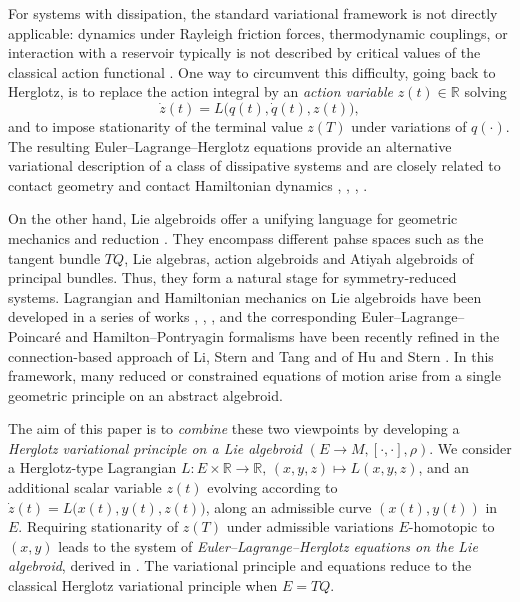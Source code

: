 \documentclass[11pt,a4paper]{article}
\theoremstyle{definition}
\begin{document}
For systems with dissipation, the standard variational framework is
not directly applicable: dynamics under Rayleigh friction forces, thermodynamic
couplings, or interaction with a reservoir typically is not described by critical values of the classical action functional \cite{GayBalmazYoshimura2017PartI}.
One way to circumvent this difficulty, going back to Herglotz,
is to replace the action integral by an \emph{action variable}
$z(t)\in\mathbb{R}$ solving
\[
\dot z(t) = L\big(q(t),\dot q(t),z(t)\big),
\]
and to impose stationarity of the terminal value $z(T)$ under
variations of $q(\cdot)$.
The resulting Euler--Lagrange--Herglotz equations provide an alternative
variational description of a class of dissipative systems and
are closely related to contact geometry and contact Hamiltonian dynamics \cite{de2019contact}, \cite{de2020infinitesimal}, \cite{colombo2025liouville}, \cite{colombo2025homogeneous}.

On the other hand, Lie algebroids offer a unifying language for
geometric mechanics and reduction \cite{weinstein1996lagrangian}.
They encompass different pahse spaces such as the tangent bundle $TQ$, Lie algebras, action
algebroids and Atiyah algebroids of principal bundles. Thus, they form
a natural stage for symmetry-reduced
systems.
Lagrangian and Hamiltonian mechanics on Lie algebroids have been
developed in a series of works \cite{martinez2001lagrangian}, \cite{de2005lagrangian}, \cite{grabowska2006geometrical}, and the corresponding
Euler--Lagrange--Poincar\'e and Hamilton--Pontryagin formalisms have
been recently refined in the connection-based approach of
Li, Stern and Tang \cite{li2017lagrangian} and of Hu and Stern \cite{hu2024hamiltonian}.
In this framework, many reduced or constrained equations of motion
arise from a single geometric principle on an abstract algebroid.

The aim of this paper is to \emph{combine} these two viewpoints by
developing a \emph{Herglotz variational principle on a Lie algebroid}
$(E\to M,[\cdot,\cdot],\rho)$.
We consider a Herglotz-type Lagrangian $L \colon E \times \mathbb{R} \to \mathbb{R},\, (x,y,z)\mapsto L(x,y,z)$, and an additional scalar variable $z(t)$ evolving according to $\dot z(t) = L\big(x(t),y(t),z(t)\big)$, along an admissible curve $(x(t),y(t))$ in $E$.
Requiring stationarity of $z(T)$ under admissible variations
$E$-homotopic to $(x,y)$ leads to the system of
\emph{Euler--Lagrange--Herglotz equations on the Lie algebroid}, derived in \cite{anahory2024euler}. The variational principle and equations reduce to the classical Herglotz variational principle when
$E=TQ$.
\end{document}
